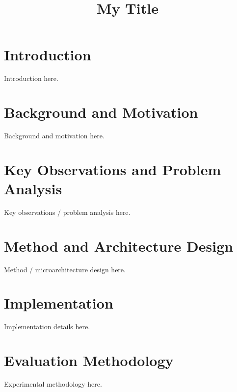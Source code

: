 \documentclass[acmsmall,manuscript,review,anonymous]{acmart}
\begin{document}
\title{My Title}



\maketitle

\section{Introduction}
\label{sec:intro}
Introduction here.

\section{Background and Motivation}
\label{sec:background}
Background and motivation here.

\section{Key Observations and Problem Analysis}
\label{sec:analysis}
Key observations / problem analysis here.

\section{Method and Architecture Design}
\label{sec:method}
Method / microarchitecture design here.

\section{Implementation}
\label{sec:implementation}
Implementation details here.

\section{Evaluation Methodology}
\label{sec:methodology}
Experimental methodology here.
\end{document}
